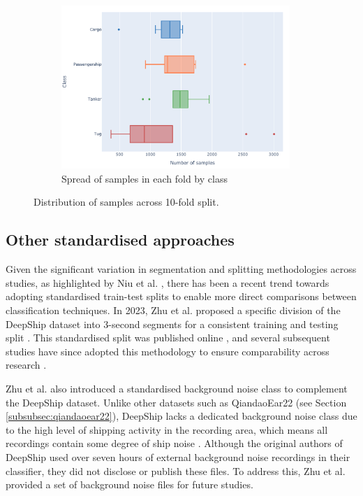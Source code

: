 \begin{figure}
    \ContinuedFloat
    \begin{subfigure}[t]{\textwidth}
        \centering
        \includegraphics[width=0.95\textwidth]{img/ch3/10_fold_spread.pdf}
        \caption{Spread of samples in each fold by class}
        \label{fig:10-fold-spread}
    \end{subfigure}
    \caption{Distribution of samples across 10-fold split.}
    \label{fig:10-fold-overview}
\end{figure}

\subsection{Other standardised approaches}

Given the significant variation in segmentation and splitting methodologies across studies, as highlighted by Niu et al. \cite{niu_advances_2023}, there has been a recent trend towards adopting standardised train-test splits to enable more direct comparisons between classification techniques. In 2023, Zhu et al. proposed a specific division of the DeepShip dataset into 3-second segments for a consistent training and testing split \cite{zhu_underwater_2023}. This standardised split was published online \cite{zhupengsen_zhupengsenmethod-for-splitting--deepship-dataset_2024}, and several subsequent studies have since adopted this methodology to ensure comparability across research \cite{xu_self-supervised_2023, xu_self-supervised_2024, zhu_sfc-sup_2023, lin_underwater_2024}.

Zhu et al. also introduced a standardised background noise class to complement the DeepShip dataset. Unlike other datasets such as QiandaoEar22 (see Section \ref{subsubsec:qiandaoear22}), DeepShip lacks a dedicated background noise class due to the high level of shipping activity in the recording area, which means all recordings contain some degree of ship noise \cite{irfan_deepship_2021}. Although the original authors of DeepShip used over seven hours of external background noise recordings in their classifier, they did not disclose or publish these files. To address this, Zhu et al. provided a set of background noise files for future studies.

